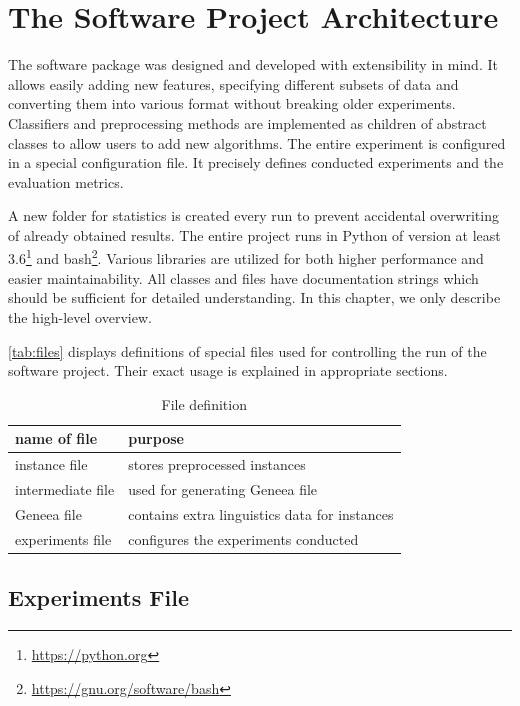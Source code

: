 \chapter{The Software Project Architecture}
\label{chap:arch}

The software package was designed and developed with extensibility in mind.
It allows easily adding new features, specifying different subsets of data and converting them into various format without breaking older experiments.
Classifiers and preprocessing methods are implemented as children of abstract classes to allow users to add new algorithms.
The entire experiment is configured in a special configuration file.
It precisely defines conducted experiments and the evaluation metrics.

A new folder for statistics is created every run to prevent accidental overwriting of already obtained results.
The entire project runs in Python of version at least 3.6\footnote{\url{https://python.org}} and bash\footnote{\url{https://gnu.org/software/bash}}.
Various libraries are utilized for both higher performance and easier maintainability.
All classes and files have documentation strings which should be sufficient for detailed understanding.
In this chapter, we only describe the high-level overview.

\autoref{tab:files} displays definitions of special files used for controlling the run of the software project.
Their exact usage is explained in appropriate sections.

\begin{table}[h]

\centering
\begin{tabular}{ll}
\toprule
\textbf{name of file}& \textbf{purpose} \\
\midrule
instance file		 & stores preprocessed instances \\
intermediate file	 & used for generating Geneea file \\
Geneea file			 & contains extra linguistics data for instances \\
experiments file	 & configures the experiments conducted \\
\bottomrule
\end{tabular}

\caption{File definition}\label{tab:files}
\end{table}



\section{Experiments File}

